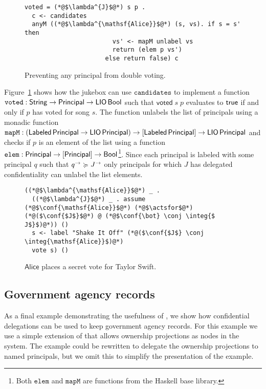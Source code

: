 \begin{figure}
\centering
\begin{lstlisting}
voted = (*@$\lambda^{J}$@*) s p .
  c <- candidates
  anyM ((*@$\lambda^{\mathsf{Alice}}$@*) (s, vs). if s = s' then
                        vs' <- mapM unlabel vs
                        return (elem p vs')
                      else return false) c
\end{lstlisting}
\caption{Preventing any principal from double voting.}
\label{fig:prevent-double-voting}
\end{figure}

Figure~\ref{fig:prevent-double-voting} shows how the jukebox can use $\mathtt{candidates}$ to implement a function $\mathtt{voted}: \mathsf{String} \to \mathsf{Principal} \to \mathsf{LIO}\,\mathsf{Bool}$ such that $\mathsf{voted}\; s\; p$ evaluates to $\mathsf{true}$ if and only if $p$ has voted for song $s$. The function unlabels the list of principals using a monadic function $\mathtt{mapM}: (\mathsf{Labeled}\,\mathsf{Principal} \to \mathsf{LIO}\,\mathsf{Principal}) \to \lbrack\mathsf{Labeled}\,\mathsf{Principal}\rbrack \to \mathsf{LIO}\,\mathsf{Principal}$ and checks if $p$ is an element of the list using a function $\mathtt{elem}: \mathsf{Principal} \to \lbrack\mathsf{Principal}\rbrack \to \mathsf{Bool}$\footnote{Both $\mathtt{elem}$ and $\mathtt{mapM}$ are functions from the Haskell base library.}. Since each principal is labeled with some principal $q$ such that $q^{\rightarrow} \succcurlyeq J^{\rightarrow}$ only principals for which $J$ has delegated confidentiality can unlabel the list elements.

\begin{figure}
\centering
\begin{lstlisting}
((*@$\lambda^{\mathsf{Alice}}$@*) _ .
  ((*@$\lambda^{J}$@*) _ . assume (*@$\conf{\mathsf{Alice}}$@*) (*@$\actsfor$@*) (*@($\conf{$J$}$@*) @ (*@$\conf{\bot} \conj \integ{$ J$}$)@*)) ()
  s <- label "Shake It Off" (*@($\conf{$J$} \conj \integ{\mathsf{Alice}}$)@*)
  vote s) ()
\end{lstlisting}
\caption{$\mathsf{Alice}$ places a secret vote for Taylor Swift.}
\label{fig:jukebox-alice-votes-for-taylor-swift}
\end{figure}

\subsection{Government agency records}\label{subsec:agents}
As a final example demonstrating the usefulness of \lang, we show how confidential delegations can be used to keep government agency records. For this example we use a simple extension of \lang{} that allows ownership projections as nodes in the system. The example could be rewritten to delegate the ownership projections to named principals, but we omit this to simplify the presentation of the example.

